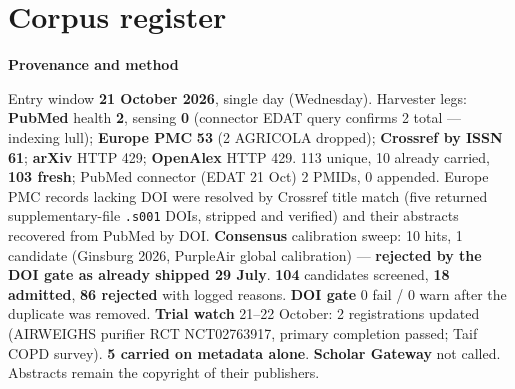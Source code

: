 \documentclass[10pt]{article}
\begin{document}
\clearpage
\section*{\sffamily\bfseries\color{Deep}Corpus register}
\vspace{-1.5mm}{\color{Amber}\rule{\linewidth}{1.1pt}}\vspace{2.5mm}



\vspace{2mm}

\begin{keybox}
{\sffamily\bfseries\footnotesize\color{Deep}Provenance and method}\\[1.2mm]
{\fontsize{7.2}{8.8}\selectfont
Entry window \textbf{21 October 2026}, single day (Wednesday). Harvester legs: \textbf{PubMed} health
\textbf{2}, sensing \textbf{0} (connector EDAT query confirms 2 total --- indexing lull); \textbf{Europe PMC}
\textbf{53} (2 AGRICOLA dropped); \textbf{Crossref by ISSN} \textbf{61}; \textbf{arXiv} HTTP 429;
\textbf{OpenAlex} HTTP 429. 113 unique, 10 already carried, \textbf{103 fresh}; PubMed connector (EDAT 21 Oct)
2 PMIDs, 0 appended. Europe PMC records lacking DOI were resolved by Crossref title match (five returned
supplementary-file \texttt{.s001} DOIs, stripped and verified) and their abstracts recovered from PubMed by DOI.
\textbf{Consensus} calibration sweep: 10 hits, 1 candidate (Ginsburg 2026, PurpleAir global calibration) ---
\textbf{rejected by the DOI gate as already shipped 29 July}. \textbf{104} candidates screened, \textbf{18
admitted}, \textbf{86 rejected} with logged reasons. \textbf{DOI gate} 0 fail / 0 warn after the duplicate was
removed. \textbf{Trial watch} 21--22 October: 2 registrations updated (AIRWEIGHS purifier RCT NCT02763917, primary
completion passed; Taif COPD survey). \textbf{5 carried on metadata alone}. \textbf{Scholar Gateway} not called.
Abstracts remain the copyright of their publishers.\par}
\end{keybox}
\end{document}
